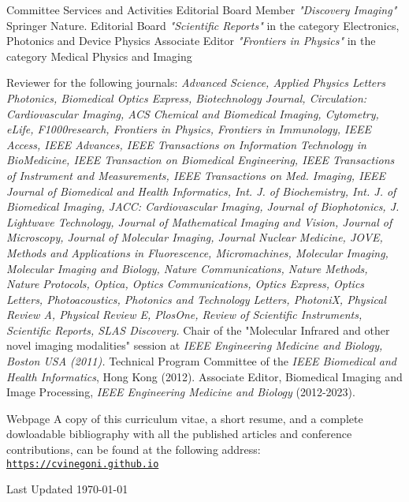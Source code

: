 \documentclass{resume}
\begin{document}
%
%
\begin{category}{Committee Services and Activities}
\citembullet 
Editorial Board Member {\it "Discovery Imaging"} Springer Nature.
\citembullet 
Editorial Board {\it "Scientific Reports"} in the category Electronics, Photonics and Device Physics
\citembullet 
Associate Editor {\it "Frontiers in Physics"} in the category Medical Physics and Imaging

\citembullet 
Reviewer for the following journals: {\it Advanced Science, Applied Physics Letters Photonics, Biomedical Optics Express, Biotechnology Journal, Circulation: Cardiovascular Imaging, ACS Chemical and Biomedical Imaging, Cytometry, eLife, F1000research, Frontiers in Physics, Frontiers in Immunology, IEEE Access, IEEE Advances, IEEE Transactions on Information Technology in BioMedicine,  IEEE Transaction on Biomedical Engineering, IEEE Transactions of Instrument and Measurements, IEEE Transactions on Med. Imaging,  IEEE Journal of Biomedical and Health Informatics, Int. J. of Biochemistry, Int. J. of Biomedical Imaging, JACC: Cardiovascular Imaging, Journal of Biophotonics, J. Lightwave Technology, Journal of Mathematical Imaging and Vision, Journal of Microscopy, Journal of Molecular Imaging, Journal Nuclear Medicine, JOVE,  Methods and Applications in Fluorescence, Micromachines, Molecular Imaging, Molecular Imaging and Biology, Nature Communications, Nature Methods, Nature Protocols, Optica, Optics Communications, Optics Express, Optics Letters, Photoacoustics, Photonics and Technology Letters, PhotoniX, Physical Review A, Physical Review E, PlosOne, Review of Scientific Instruments, Scientific Reports, SLAS Discovery.}
\citembullet 
Chair of the "Molecular Infrared and other novel imaging modalities" session at {\it IEEE Engineering Medicine and Biology, Boston USA (2011).}
\citembullet 
Technical Program Committee of the {\it IEEE Biomedical and Health Informatics}, Hong Kong (2012).
\citembullet 
Associate Editor, Biomedical Imaging and Image Processing, {\it IEEE Engineering Medicine and Biology} (2012-2023).
\end{category}

\begin{category}{Webpage}
 \citemnobullet 
A copy of this curriculum vitae, a short
resume, and a complete dowloadable bibliography with all the
published articles and conference contributions, can be found at the
following address:
\newline
    \mbox{\small\tt \url{https://cvinegoni.github.io}}
\end{category}

\begin{category}{Last Updated}
\citemnobullet 
\today{}
\end{category}

\end{document}
